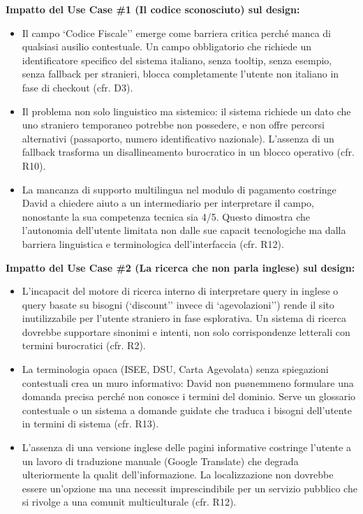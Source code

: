 \documentclass[11pt,a4paper]{article}
\begin{document}
\begin{tcolorbox}[colback=backgroundColor,colframe=borderColor,arc=2mm]
    {\small
    \textbf{Impatto del Use Case \#1 (Il codice sconosciuto) sul design:} \\[4pt]
    \begin{itemize}[leftmargin=*]
        \item Il campo `Codice Fiscale'' emerge come barriera critica perch\'e manca di qualsiasi ausilio contestuale. Un campo obbligatorio che richiede un identificatore specifico del sistema italiano, senza tooltip, senza esempio, senza fallback per stranieri, blocca completamente l'utente non italiano in fase di checkout (cfr. D3).
        \item Il problema non \e solo linguistico ma sistemico: il sistema richiede un dato che uno straniero temporaneo potrebbe non possedere, e non offre percorsi alternativi (passaporto, numero identificativo nazionale). L'assenza di un fallback trasforma un disallineamento burocratico in un blocco operativo (cfr. R10).
        \item La mancanza di supporto multilingua nel modulo di pagamento costringe David a chiedere aiuto a un intermediario per interpretare il campo, nonostante la sua competenza tecnica sia 4/5. Questo dimostra che l'autonomia dell'utente \e limitata non dalle sue capacit\ tecnologiche ma dalla barriera linguistica e terminologica dell'interfaccia (cfr. R12).
    \end{itemize}
    \vspace{0.2cm}
    \textbf{Impatto del Use Case \#2 (La ricerca che non parla inglese) sul design:} \\[4pt]
    \begin{itemize}[leftmargin=*]
        \item L'incapacit\ del motore di ricerca interno di interpretare query in inglese o query basate su bisogni (`discount'' invece di `agevolazioni'') rende il sito inutilizzabile per l'utente straniero in fase esplorativa. Un sistema di ricerca dovrebbe supportare sinonimi e intenti, non solo corrispondenze letterali con termini burocratici (cfr. R2).
        \item La terminologia opaca (ISEE, DSU, Carta Agevolata) senza spiegazioni contestuali crea un muro informativo: David non pu\o nemmeno formulare una domanda precisa perch\'e non conosce i termini del dominio. Serve un glossario contestuale o un sistema a domande guidate che traduca i bisogni dell'utente in termini di sistema (cfr. R13).
        \item L'assenza di una versione inglese delle pagini informative costringe l'utente a un lavoro di traduzione manuale (Google Translate) che degrada ulteriormente la qualit\ dell'informazione. La localizzazione non dovrebbe essere un'opzione ma una necessit\ imprescindibile per un servizio pubblico che si rivolge a una comunit\ multiculturale (cfr. R12).
    \end{itemize}
    }
\end{tcolorbox}
\end{document}
